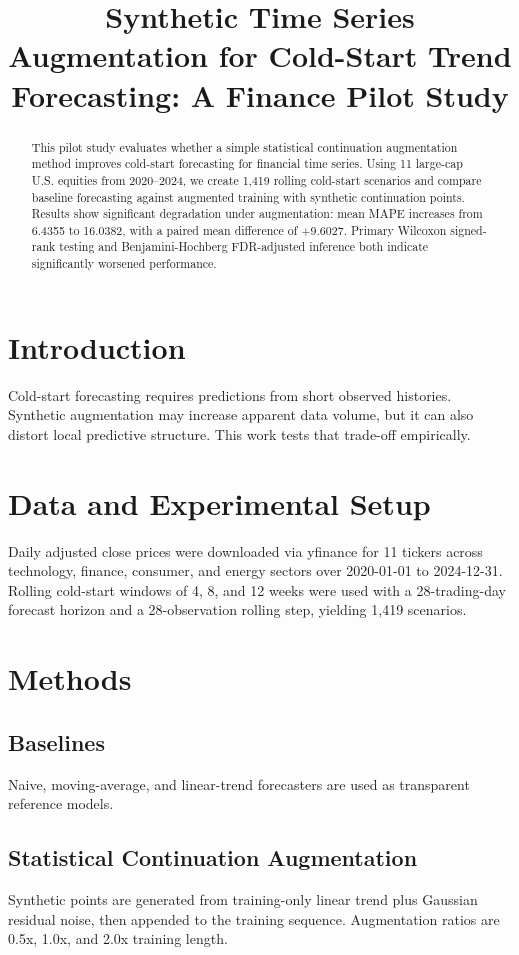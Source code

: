 \documentclass[conference]{IEEEtran}
\title{Synthetic Time Series Augmentation for Cold-Start Trend Forecasting: A Finance Pilot Study}
\author{
\IEEEauthorblockN{Author Name}
\IEEEauthorblockA{Department / University\\
email@example.com}
}
\begin{document}
\maketitle

\begin{abstract}
This pilot study evaluates whether a simple statistical continuation augmentation method improves cold-start forecasting for financial time series. Using 11 large-cap U.S. equities from 2020--2024, we create 1,419 rolling cold-start scenarios and compare baseline forecasting against augmented training with synthetic continuation points. Results show significant degradation under augmentation: mean MAPE increases from 6.4355 to 16.0382, with a paired mean difference of +9.6027. Primary Wilcoxon signed-rank testing and Benjamini-Hochberg FDR-adjusted inference both indicate significantly worsened performance.
\end{abstract}

\section{Introduction}
Cold-start forecasting requires predictions from short observed histories. Synthetic augmentation may increase apparent data volume, but it can also distort local predictive structure. This work tests that trade-off empirically.

\section{Data and Experimental Setup}
Daily adjusted close prices were downloaded via yfinance for 11 tickers across technology, finance, consumer, and energy sectors over 2020-01-01 to 2024-12-31. Rolling cold-start windows of 4, 8, and 12 weeks were used with a 28-trading-day forecast horizon and a 28-observation rolling step, yielding 1,419 scenarios.

\section{Methods}
\subsection{Baselines}
Naive, moving-average, and linear-trend forecasters are used as transparent reference models.

\subsection{Statistical Continuation Augmentation}
Synthetic points are generated from training-only linear trend plus Gaussian residual noise, then appended to the training sequence. Augmentation ratios are 0.5x, 1.0x, and 2.0x training length.
\end{document}

